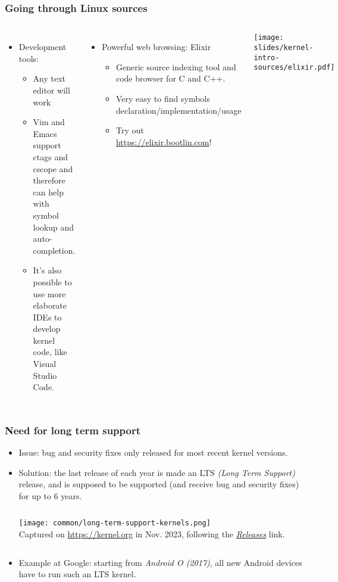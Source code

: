 \begin{frame}
  \frametitle{Going through Linux sources}
  \begin{columns}
    \begin{itemize}
    \item Development tools:
      \begin{itemize}
      \item Any text editor will work
      \item Vim and Emacs support ctags and cscope and therefore can help
        with symbol lookup and auto-completion.
      \item It's also possible to use more elaborate IDEs to develop
        kernel code, like Visual Studio Code.
      \end{itemize}
    \end{itemize}
    \begin{itemize}
    \item Powerful web browsing: Elixir
      \begin{itemize}
      \item Generic source indexing tool and code browser for C and C++.
      \item Very easy to find symbols declaration/implementation/usage
      \item Try out \url{https://elixir.bootlin.com}!
      \end{itemize}
    \end{itemize}
    \begin{center}
      \texttt{[image: slides/kernel-intro-sources/elixir.pdf]}
    \end{center}
  \end{columns}
\end{frame}

\begin{frame}[fragile]
  \frametitle{Need for long term support}
  \begin{itemize}
  \item Issue: bug and security fixes only released for most recent
    kernel versions.
  \item Solution: the last release of each year is made an LTS {\em (Long Term
     Support)} release, and is supposed to be supported (and receive bug
    and security fixes) for up to 6 years.
  \begin{columns}
  \texttt{[image: common/long-term-support-kernels.png]}\\
  \scriptsize
   Captured on \url{https://kernel.org} in Nov. 2023, following the
   \href{https://www.kernel.org/category/releases.html}{\em Releases} link.
  \end{columns}
  \item Example at Google: starting from {\em Android O (2017)}, all new Android devices
    have to run such an LTS kernel.
  \end{itemize}
\end{frame}

